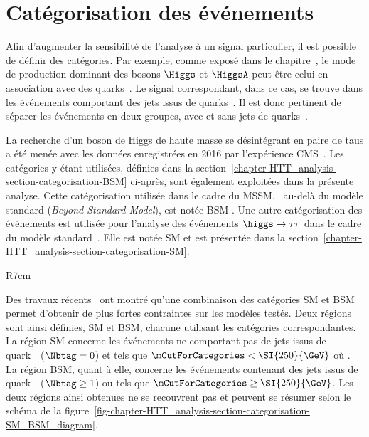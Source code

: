 \section{Catégorisation des événements}\label{chapter-HTT_analysis-section-categorisation}
Afin d'augmenter la sensibilité de l'analyse à un signal particulier, il est possible de définir des catégories.
Par exemple, comme exposé dans le chapitre~, le mode de production dominant des bosons $\Higgs$ et $\HiggsA$ peut être celui en association avec des quarks~\quarkb.
Le signal correspondant, dans ce cas, se trouve dans les événements comportant des jets issus de quarks~\quarkb.
Il est donc pertinent de séparer les événements en deux groupes, avec et sans jets de quarks~\quarkb.
\par
La recherche d'un boson de Higgs de haute masse se désintégrant en paire de taus a été menée avec les données enregistrées en 2016 par l'expérience CMS~\cite{CMS-PAS-HIG-17-020}.
Les catégories y étant utilisées, définies dans la section~\ref{chapter-HTT_analysis-section-categorisation-BSM} ci-après, sont également exploitées dans la présente analyse.
Cette catégorisation utilisée dans le cadre du MSSM, \ie\ au-delà du modèle standard (\emph{Beyond Standard Model}), est notée \og BSM \fg{}.
Une autre catégorisation des événements est utilisée pour l'analyse des événements $\higgs\to\tau\tau$ dans le cadre du modèle standard~\cite{CMS-PAS-HIG-19-010}. 
Elle est notée \og SM \fg{} et est présentée dans la section~\ref{chapter-HTT_analysis-section-categorisation-SM}.
\begin{wrapfigure}{R}{7cm}
\centering

\caption{Définition des deux régions utilisant des catégories différentes.}
\label{fig-chapter-HTT_analysis-section-categorisation-SM_BSM_diagram}
\end{wrapfigure}
\par
Des travaux récents~\cite{Artur_thesis} ont montré qu'une combinaison des catégories SM et BSM permet d'obtenir de plus fortes contraintes sur les modèles testés.
Deux régions sont ainsi définies, SM et BSM, chacune utilisant les catégories correspondantes.
La région SM concerne les événements ne comportant pas de jets issus de quark~\quarkb\ ($\Nbtag=0$) et tels que $\mCutForCategories < \SI{250}{\GeV}$ où
\mCutForCategoriesdef.
La région BSM, quant à elle, concerne les événements contenant des jets issus de quark~\quarkb\ ($\Nbtag\geq1$) ou tels que $\mCutForCategories \geq \SI{250}{\GeV}$.
Les deux régions ainsi obtenues ne se recouvrent pas et peuvent se résumer selon le schéma de la figure~\ref{fig-chapter-HTT_analysis-section-categorisation-SM_BSM_diagram}.


